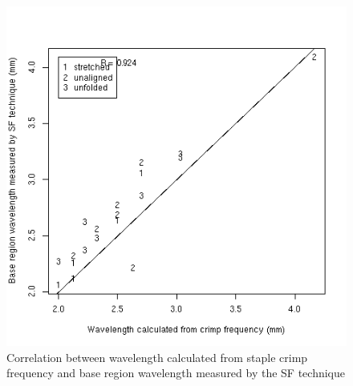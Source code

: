 %

\begin{figure}[!h]
  \centering
  \includegraphics[width=1.0\textwidth]{figcrimpwavlsfbase.png}
  \caption{Correlation between wavelength calculated from staple crimp frequency and base region wavelength measured by the SF technique}
  \label{fig:crimpwavlsfbase}
\end{figure}

%

